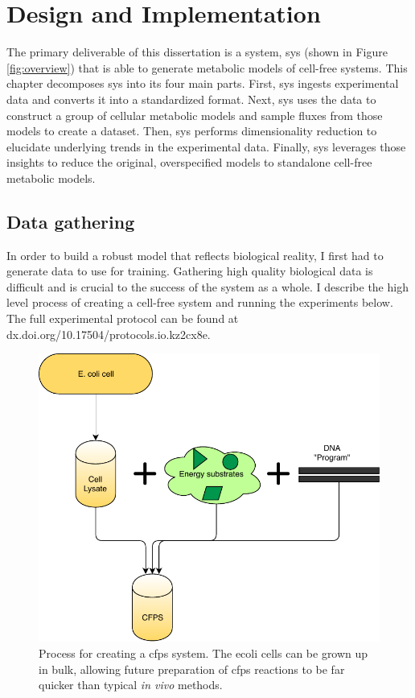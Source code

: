 \chapter{Design and Implementation} \label{chap:impl}

The primary deliverable of this dissertation is a system, \gls{sys} (shown in Figure \ref{fig:overview}) that is able to generate metabolic models of cell-free systems.
This chapter decomposes \gls{sys} into its four main parts.
First, \gls{sys} ingests experimental data and converts it into a standardized format.
Next, \gls{sys} uses the data to construct a group of cellular metabolic models and sample fluxes from those models to create a dataset.
Then, \gls{sys} performs dimensionality reduction to elucidate underlying trends in the experimental data.
Finally, \gls{sys} leverages those insights to reduce the original, overspecified models to standalone cell-free metabolic models.

\section{Data gathering}
In order to build a robust model that reflects biological reality, I first had to generate data to use for training.
Gathering high quality biological data is difficult and is crucial to the success of the system as a whole.
I describe the high level process of creating a cell-free system and running the experiments below.
The full experimental protocol can be found at dx.doi.org/10.17504/protocols.io.kz2cx8e.

\begin{figure}[t!]
\begin{center}
\includegraphics{figs/CellFreeSetup.pdf}
\caption[Process for creating a \gls{cfps} system]{Process for creating a \gls{cfps} system.
The \gls{ecoli} cells can be grown up in bulk, allowing future preparation of \gls{cfps} reactions to be far quicker than typical \textit{in vivo} methods.
}
\end{center}
\label{fig:cfps}
\end{figure}

